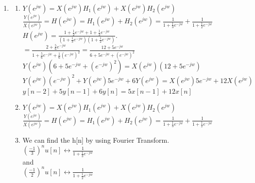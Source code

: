 \documentclass[10pt,a4paper, margin=1in]{article}
\begin{document}
\begin{enumerate}
    \item %
          \begin{enumerate}
              \item %
              $Y(e^{jw}) = X(e^{jw}) H_1(e^{jw}) + X(e^{jw}) H_2(e^{jw})$ \\

              $\frac{Y(e^{jw})}{X(e^{jw})} = H(e^{jw}) = H_1(e^{jw}) + H_2(e^{jw}) = \frac{1}{1 + \frac{1}{3}e^{-jw}} + \frac{1}{1 + \frac{1}{2}e^{-jw}}$ \\

              $H(e^{jw}) = \frac{1 + \frac{1}{2}e^{-jw} + 1 + \frac{1}{3}e^{-jw}}{(1 + \frac{1}{3}e^{-jw})(1 + \frac{1}{2}e^{-jw})}.$ \\

              $= \frac{2 + \frac{5}{6} e^{-jw}}{1+ \frac{5}{6}e^{-jw}+\frac{1}{6}(e^{-jw})^2} = \frac{12 + 5e^{-jw}}{6+5e^{-jw}+(e^{-jw})^2}$ \\

              $Y(e^{jw}) (6+5e^{-jw}+(e^{-jw})^2) = X(e^{jw}) (12 + 5e^{-jw})$ \\

              $Y(e^{jw}) (e^{-jw})^2 + Y(e^{jw}) 5e^{-jw}+ 6Y(e^{jw}) = X(e^{jw}) 5e^{-jw}+ 12X(e^{jw})$ \\

              $y[n-2] + 5y[n-1] +6y[n] = 5x[n-1] + 12x[n]$
            
              \item %
              $Y(e^{jw}) = X(e^{jw}) H_1(e^{jw}) + X(e^{jw}) H_2(e^{jw})$ \\

              $\frac{Y(e^{jw})}{X(e^{jw})} = H(e^{jw}) = H_1(e^{jw}) + H_2(e^{jw}) = \frac{1}{1 + \frac{1}{3}e^{-jw}} + \frac{1}{1 + \frac{1}{2}e^{-jw}}$ \\
              \item %
              We can find the h[n] by using Fourier Transform. \\
              $(\frac{-1}{3})^nu[n] \leftrightarrow \frac{1}{1 + \frac{1}{3}e^{-jw}}$ \\
              
              and \\

              $(\frac{-1}{2})^nu[n] \leftrightarrow \frac{1}{1 + \frac{1}{2}e^{-jw}}$ \\


\end{enumerate}
\end{enumerate}
\end{document}
